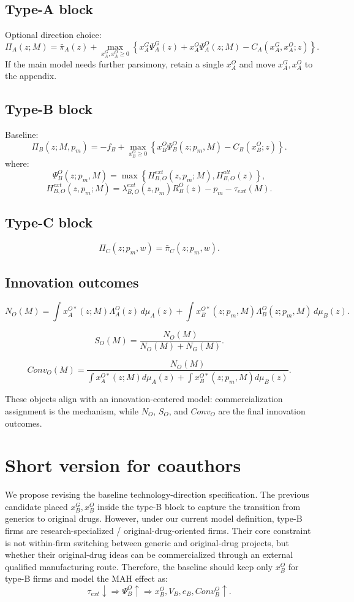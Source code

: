 \documentclass[12pt]{article}
\begin{document}
\subsection{Type-A block}

Optional direction choice:
\[
\Pi_A(z;M)
=
\bar{\pi}_A(z)
+
\max_{x_A^G,x_A^O\ge 0}
\left\{
x_A^G\Psi_A^G(z)
+
x_A^O\Psi_A^O(z;M)
-
C_A(x_A^G,x_A^O;z)
\right\}.
\]
If the main model needs further parsimony, retain a single $x_A^O$ and move $x_A^G,x_A^O$ to the appendix.

\subsection{Type-B block}

Baseline:
\[
\Pi_B(z;M,p_m)
=
-f_B
+
\max_{x_B^O\ge 0}
\left\{
x_B^O\Psi_B^O(z;p_m,M)
-
C_B(x_B^O;z)
\right\}.
\]
where:
\[
\Psi_B^O(z;p_m,M)
=
\max
\left\{
H_{B,O}^{ext}(z,p_m;M),
H_{B,O}^{alt}(z)
\right\},
\]
\[
H_{B,O}^{ext}(z,p_m;M)
=
\lambda_{B,O}^{ext}(z,p_m)R_B^O(z)
-
p_m
-
\tau_{ext}(M).
\]

\subsection{Type-C block}

\[
\Pi_C(z;p_m,w)
=
\bar{\pi}_C(z;p_m,w).
\]

\subsection{Innovation outcomes}

\[
N_O(M)
=
\int x_A^{O*}(z;M)\Lambda_A^O(z)\,d\mu_A(z)
+
\int x_B^{O*}(z;p_m,M)\Lambda_B^O(z;p_m,M)\,d\mu_B(z).
\]

\[
S_O(M)
=
\frac{N_O(M)}{N_O(M)+N_G(M)}.
\]

\[
Conv_O(M)
=
\frac{N_O(M)}
{\int x_A^{O*}(z;M)d\mu_A(z)+\int x_B^{O*}(z;p_m,M)d\mu_B(z)}.
\]

These objects align with an innovation-centered model: commercialization assignment is the mechanism, while $N_O$, $S_O$, and $Conv_O$ are the final innovation outcomes.

\section{Short version for coauthors}

We propose revising the baseline technology-direction specification. The previous candidate placed $x_B^G,x_B^O$ inside the type-B block to capture the transition from generics to original drugs. However, under our current model definition, type-B firms are research-specialized / original-drug-oriented firms. Their core constraint is not within-firm switching between generic and original-drug projects, but whether their original-drug ideas can be commercialized through an external qualified manufacturing route. Therefore, the baseline should keep only $x_B^O$ for type-B firms and model the MAH effect as:
\[
\tau_{ext}\downarrow
\Rightarrow
\Psi_B^O\uparrow
\Rightarrow
x_B^O,V_B,e_B,Conv_B^O\uparrow.
\]
\end{document}
